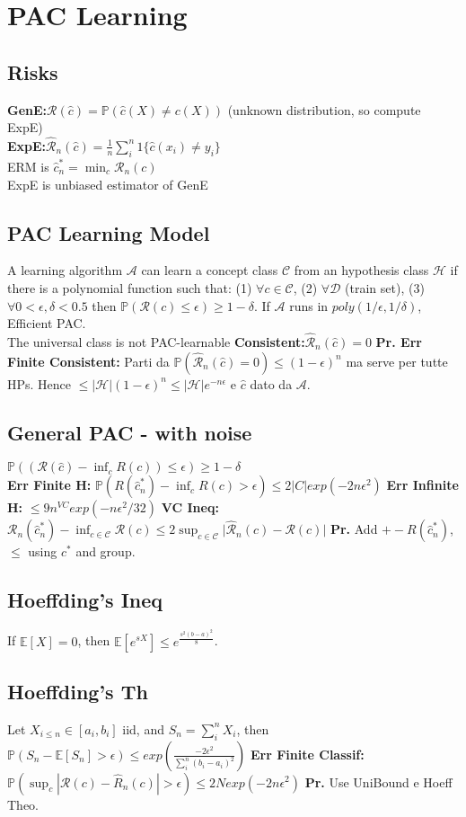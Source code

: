 \section*{PAC Learning}
\subsection*{Risks}
\textbf{GenE:}$\mathcal{R}(\hat c)=\mathbb{P}(\hat{c}(X)\ne c(X))$ (unknown distribution, so compute ExpE)\\
\textbf{ExpE:}$\mathcal{\hat R}_n(\hat c)=\frac{1}{n}\sum^n_i1\{\hat c(x_i)\ne y_i\}$\\
ERM is $\hat c_{n}^*=\min_c \hat{\mathcal R_n}(c)$\\
ExpE is unbiased estimator of GenE
\subsection*{PAC Learning Model}
A learning algorithm $\mathcal A$ can learn a concept class $\mathcal C$ from an hypothesis class $\mathcal H$ if there is a polynomial function such that: (1) $\forall c\in\mathcal C$, (2) $\forall\mathcal D$ (train set), (3) $\forall 0<\epsilon,\delta<0.5$ then $\mathbb{P}(\mathcal R(c)\le\epsilon)\ge 1-\delta$. If $\mathcal A$ runs in $poly(1/\epsilon,1/\delta)$, Efficient PAC.\\
The universal class is not PAC-learnable
\textbf{Consistent:}$\mathcal{\hat R}_n(\hat c)=0$
\textbf{Pr. Err Finite Consistent:} Parti da $\mathbb{P}(\mathcal {\hat R}_n(\hat c)=0)\le (1-\epsilon)^n$ ma serve per tutte HPs. Hence $\le |\mathcal H|(1-\epsilon)^n\le|\mathcal H|e^{-n\epsilon}$ e $\hat c$ dato da $\mathcal A$.
\subsection*{General PAC - with noise}
$\mathbb{P}((\mathcal R(\hat c)-\inf_c R(c))\le\epsilon)\ge 1-\delta$\\
\textbf{Err Finite H:} $\mathbb{P}(R(\hat c_n^*)-\inf_cR(c)>\epsilon)\le 2|C|exp(-2n\epsilon^2)$
\textbf{Err Infinite H:} $\le 9n^{VC}exp(-n\epsilon^2/32)$
\textbf{VC Ineq:} $\mathcal{R}_n(\hat{c}_n^*)-\inf_{c\in\mathcal{C}}\mathcal{R}(c) \leq 2\sup_{c\in\mathcal{C}}\lvert \hat{\mathcal{R}}_n(c) - \mathcal{R}(c) \rvert$ \textbf{Pr.} Add $\mathcal +-R(\hat c_n^*)$, $\le$ using $c^*$ and group.
\subsection*{Hoeffding's Ineq}
If $\mathbb{E}[X]=0$, then $\mathbb{E}[e^{sX}]\le e^{\frac{s^2(b-a)^2}{8}}$.
\subsection*{Hoeffding's Th}
Let $X_{i\le n}\in[a_i,b_i]$ iid, and $S_n=\sum_i^nX_i$, then $\mathbb{P}(S_n-\mathbb{E}[S_n]>\epsilon)\le exp(\frac{-2\epsilon^2}{\sum_i^n(b_i-a_i)^2})$
\textbf{Err Finite Classif:} $\mathbb{P}(\sup_c|\mathcal R(c)-\hat R_n(c)|>\epsilon)\le 2Nexp(-2n\epsilon^2)$ \textbf{Pr.} Use UniBound e Hoeff Theo.